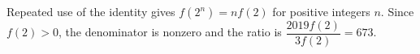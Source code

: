 Repeated use of the identity gives $ f(2^n)=nf(2)$ for positive integers $ n $. Since $ f(2)>0 $, the denominator is nonzero and the ratio is $\dfrac{2019f(2)}{3f(2)}=\boxed{673}$.

